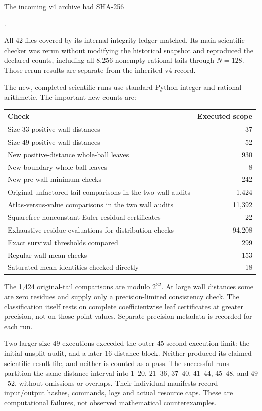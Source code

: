 \documentclass[11pt,letterpaper]{article}
\begin{document}
The incoming v4 archive had SHA-256

.

All 42 files covered by its internal integrity ledger matched. Its main scientific checker was rerun without modifying the historical snapshot and reproduced the declared counts, including all 8,256 nonempty rational tails through \(N=128\). Those rerun results are separate from the inherited v4 record.

The new, completed scientific runs use standard Python integer and rational arithmetic. The important new counts are:

\begin{longtable}[]{@{}lr@{}}
\toprule\noalign{}
Check & Executed scope \\
\midrule\noalign{}
\endhead
\bottomrule\noalign{}
\endlastfoot
Size-33 positive wall distances & 37 \\
Size-49 positive wall distances & 52 \\
New positive-distance whole-ball leaves & 930 \\
New boundary whole-ball leaves & 8 \\
New pre-wall minimum checks & 242 \\
Original unfactored-tail comparisons in the two wall audits & 1,424 \\
Atlas-versus-value comparisons in the two wall audits & 11,392 \\
Squarefree nonconstant Euler residual certificates & 22 \\
Exhaustive residue evaluations for distribution checks & 94,208 \\
Exact survival thresholds compared & 299 \\
Regular-wall mean checks & 153 \\
Saturated mean identities checked directly & 18 \\
\end{longtable}

The 1,424 original-tail comparisons are modulo \(2^{32}\). At large wall distances some are zero residues and supply only a precision-limited consistency check. The classification itself rests on complete coefficientwise leaf certificates at greater precision, not on those point values. Separate precision metadata is recorded for each run.

Two larger size-49 executions exceeded the outer 45-second execution limit: the initial unsplit audit, and a later 16-distance block. Neither produced its claimed scientific result file, and neither is counted as a pass. The successful runs partition the same distance interval into \(1\)--\(20\), \(21\)--\(36\), \(37\)--\(40\), \(41\)--\(44\), \(45\)--\(48\), and \(49\)--\(52\), without omissions or overlaps. Their individual manifests record input/output hashes, commands, logs and actual resource caps. These are computational failures, not observed mathematical counterexamples.
\end{document}
